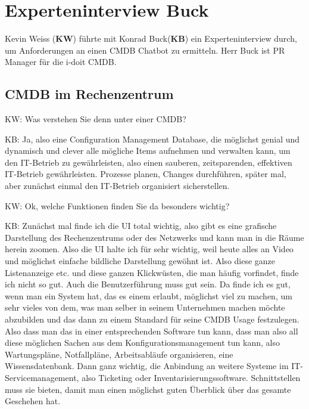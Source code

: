 \chapter{Experteninterview Buck}\label{Interview_Buck}

Kevin Weiss (\textbf{KW}) führte mit Konrad Buck(\textbf{KB}) ein Experteninterview  durch, um Anforderungen an einen CMDB Chatbot zu ermitteln. Herr Buck ist PR Manager für die i-doit CMDB.

\section*{CMDB im Rechenzentrum}

\begin{list}{X:}{\setlength{\labelsep}{5mm}}
\item[KW:] Was verstehen Sie denn unter einer CMDB? 
\item[KB:] Ja, also eine Configuration Management Database, die möglichst genial und dynamisch und clever alle mögliche Items aufnehmen und verwalten kann, um den IT-Betrieb zu gewährleisten, also einen sauberen, zeitsparenden, effektiven IT-Betrieb gewährleisten. Prozesse planen, Changes durchführen, später mal, aber zunächst einmal den IT-Betrieb organisiert sicherstellen.
\item[KW:] Ok, welche Funktionen finden Sie da besonders wichtig?
\item[KB:] Zunächst mal finde ich die UI total wichtig, also gibt es eine grafische Darstellung des Rechenzentrums oder des Netzwerks und kann man in die Räume herein zoomen. Also die UI halte ich für sehr wichtig, weil heute alles an Video und möglichst einfache bildliche Darstellung gewöhnt ist. Also diese ganze Listenanzeige etc. und diese ganzen Klickwüsten, die man häufig vorfindet, finde ich nicht so gut. Auch die Benutzerführung muss gut sein. Da finde ich es gut, wenn man ein System hat, das es einem erlaubt, möglichst viel zu machen, um sehr vieles von dem, was man selber in seinem Unternehmen machen möchte abzubilden und das dann zu einem Standard für seine CMDB Usage festzulegen. Also dass man das in einer entsprechenden Software tun kann, dass man also all diese möglichen Sachen aus dem Konfigurationsmanagement tun kann, also Wartungspläne, Notfallpläne, Arbeitsabläufe organisieren, eine Wissensdatenbank. Dann ganz wichtig, die Anbindung an weitere Systeme im IT-Servicemanagement, also Ticketing oder Inventarisierungssoftware. Schnittstellen muss sie bieten, damit man einen möglichst guten Überblick über das gesamte Geschehen hat. 
\end{list}

